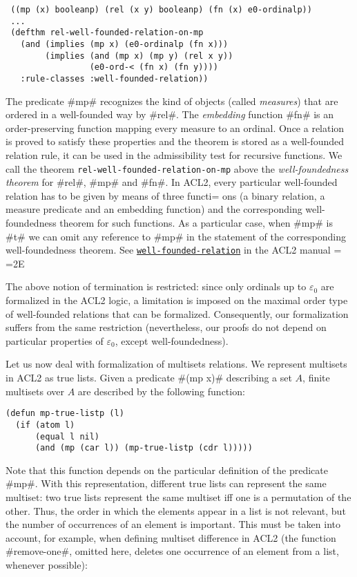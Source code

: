 \documentclass[11pt]{llncs}
\begin{document}
{\begin{verbatim}
 ((mp (x) booleanp) (rel (x y) booleanp) (fn (x) e0-ordinalp))
 ...
 (defthm rel-well-founded-relation-on-mp
   (and (implies (mp x) (e0-ordinalp (fn x)))
        (implies (and (mp x) (mp y) (rel x y))
                 (e0-ord-< (fn x) (fn y))))
   :rule-classes :well-founded-relation))
\end{verbatim}

The predicate #mp# recognizes the kind of objects (called {\em
measures}) that are ordered in a well-founded way by #rel#. The {\em
embedding} function #fn# is an order-preserving function mapping every
measure to an ordinal. Once a relation is proved to satisfy these
properties and the theorem is stored as a well-founded relation rule, it
can be used in the admissibility test for recursive functions. We call
the theorem {\tt rel\--well\--founded\--rela\-tion\--on\--mp} above the
{\em well-foundedness theorem} for #rel#, #mp# and #fn#. In ACL2, every
particular well-founded relation has to be given by means of three functi=
ons
(a binary relation, a measure predicate and an embedding function) and
the corresponding well-foundedness theorem for such functions. As a
particular case, when #mp# is #t# we can omit any reference to #mp# in
the statement of the corresponding well-foundedness theorem. See
\underline{{\tt well-founded-relation}} in the ACL2 manual \cite{ACL2man}=
=2E


The above notion of termination is restricted: since only ordinals up to
$\varepsilon_0$ are formalized in the ACL2 logic, a limitation is
imposed on the maximal order type of well-founded relations that can be
formalized. Consequently, our formalization suffers from the same
restriction (nevertheless, our proofs do not depend on particular
properties of $\varepsilon_0$, except well-foundedness).

Let us now deal with formalization of multisets relations. We
represent multisets in ACL2 as true lists. Given a predicate #(mp x)#
describing a set $A$, finite multisets over $A$ are described by the
following function:

\begin{verbatim}
(defun mp-true-listp (l)
  (if (atom l)
      (equal l nil)
      (and (mp (car l)) (mp-true-listp (cdr l)))))
\end{verbatim}

Note that this function depends on the particular definition of the
predicate #mp#. With this representation, different true lists can
represent the same multiset: two true lists represent the same multiset
iff one is a permutation of the other. Thus, the order in which the
elements appear in a list is not relevant, but the number of occurrences
of an element is important. This must be taken into account,
for example, when defining multiset difference in ACL2 (the function
#remove-one#, omitted here, deletes one occurrence of an element from a
list, whenever possible):

}
\end{document}
